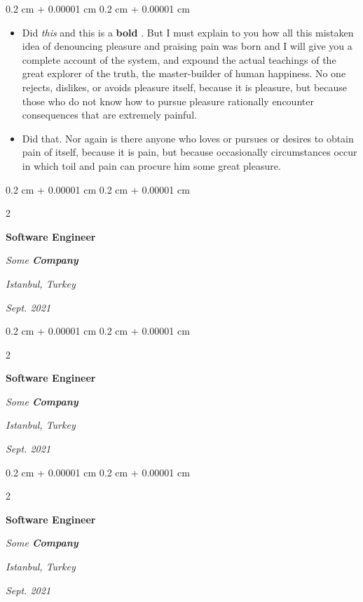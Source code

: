 \documentclass[10pt, letterpaper]{article}
\newenvironment{highlights}{
    \begin{itemize}[
        topsep=0.10 cm,
        parsep=0.10 cm,
        partopsep=0pt,
        itemsep=0pt,
        leftmargin=0.4 cm + 10pt
    ]
}{
    \end{itemize}
} %
\newenvironment{onecolentry}{
    \begin{adjustwidth}{
        0.2 cm + 0.00001 cm
    }{
        0.2 cm + 0.00001 cm
    }
}{
    \end{adjustwidth}
} %
\newenvironment{twocolentry}[2][]{
    \onecolentry
    \def\secondColumn{#2}
    \setcolumnwidth{\fill, 4.5 cm}
    \begin{paracol}{2}
}{
    \switchcolumn \raggedleft \secondColumn
    \end{paracol}
    \endonecolentry
} %
\let\hrefWithoutArrow\href
\renewcommand{\href}[2]{\hrefWithoutArrow{#1}{\mbox{\ifthenelse{\equal{#2}{}}{ }{#2 }\raisebox{.15ex}{\footnotesize \faExternalLink*}}}}
\begin{document}
        \vspace{0.10 cm-3px}
        \begin{onecolentry}
            \begin{highlights}
                \item Did \textit{this} and this is a \textbf{bold} \href{https://example.com}{link}. But I must explain to you how all this mistaken idea of denouncing pleasure and praising pain was born and I will give you a complete account of the system, and expound the actual teachings of the great explorer of the truth, the master-builder of human happiness. No one rejects, dislikes, or avoids pleasure itself, because it is pleasure, but because those who do not know how to pursue pleasure rationally encounter consequences that are extremely painful.
                \item Did that. Nor again is there anyone who loves or pursues or desires to obtain pain of itself, because it is pain, but because occasionally circumstances occur in which toil and pain can procure him some great pleasure.
            \end{highlights}
        \end{onecolentry}


        \vspace{0.2 cm-3px}

        \begin{twocolentry}{
        \textit{Istanbul, Turkey}    
            
        \textit{Sept. 2021}}
            \textbf{Software Engineer}
            
            \textit{Some \textbf{Company}}
        \end{twocolentry}



        \vspace{0.2 cm-3px}

        \begin{twocolentry}{
        \textit{Istanbul, Turkey}    
            
        \textit{Sept. 2021}}
            \textbf{Software Engineer}
            
            \textit{Some \textbf{Company}}
        \end{twocolentry}



        \vspace{0.2 cm-3px}

        \begin{twocolentry}{
        \textit{Istanbul, Turkey}    
            
        \textit{Sept. 2021}}
            \textbf{Software Engineer}
            
            \textit{Some \textbf{Company}}
        \end{twocolentry}
\end{document}
